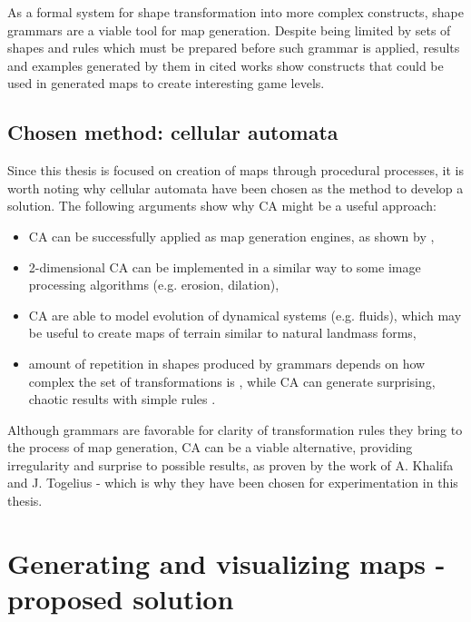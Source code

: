 \documentclass[12pt]{report}
\begin{document}
As a formal system for shape transformation into more complex constructs, shape grammars are a viable tool for map generation. Despite being limited by sets of shapes and rules which must be prepared before such grammar is applied, results and examples generated by them in cited works show constructs that could be used in generated maps to create interesting game levels.
\section{Chosen method: cellular automata}
 
Since this thesis is focused on creation of maps through procedural processes, it is worth noting why cellular automata have been chosen as the method to develop a solution. The following arguments show why CA might be a useful approach:

\begin{itemize}
	\item CA can be successfully applied as map generation engines, as shown by \autocite{johnson2010cellular},
	\item 2-dimensional CA can be implemented in a similar way to some image processing algorithms (e.g. erosion, dilation),
	\item CA are able to model evolution of dynamical systems (e.g. fluids), which may be useful to create maps of terrain similar to natural landmass forms, 
	\item amount of repetition in shapes produced by grammars depends on how complex the set of transformations is \autocite{CHOMSKY1959137}, while CA can generate surprising, chaotic results with simple rules \autocite{wolfram1984cellular}.
\end{itemize}

Although grammars are favorable for clarity of transformation rules they bring to the process of map generation, CA can be a viable alternative, providing irregularity and surprise to possible results, as proven by the work of A. Khalifa and J. Togelius \autocite{Khalifa2017MarahelA} - which is why they have been chosen for experimentation in this thesis.

\chapter{Generating and visualizing maps - proposed solution} \label{rozdzial.praktyka} 
\end{document}
